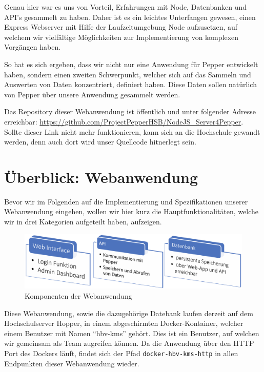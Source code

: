 Genau hier war es uns von Vorteil, Erfahrungen mit Node, Datenbanken und API's gesammelt zu haben. Daher ist es ein leichtes Unterfangen gewesen, einen Express Webserver mit Hilfe der Laufzeitumgebung Node aufzusetzen, auf welchem wir vielfältige Möglichkeiten zur Implementierung von komplexen Vorgängen haben.

So hat es sich ergeben, dass wir nicht nur eine Anwendung für Pepper entwickelt haben, sondern einen zweiten Schwerpunkt, welcher sich auf das Sammeln und Auswerten von Daten konzentriert, definiert haben. Diese Daten sollen natürlich von Pepper über unsere Anwendung gesammelt werden.

Das Repository dieser Webanwendung ist öffentlich und unter folgender Adresse erreichbar: \href{https://github.com/ProjectPepperHSB/NodeJS\_Server4Pepper}{https://github.com/ProjectPepperHSB/NodeJS\_Server4Pepper}. Sollte dieser Link nicht mehr funktionieren, kann sich an die Hochschule gewandt werden, denn auch dort wird unser Quellcode hitnerlegt sein.\\

\section{Überblick: Webanwendung}
\label{sec:nodechapter-ueberblick}
Bevor wir im Folgenden auf die Implementierung und Spezifikationen unserer Webanwendung eingehen, wollen wir hier kurz die Hauptfunktionalitäten, welche wir in drei Kategorien aufgeteilt haben, aufzeigen.\\

\begin{figure}[H]
    \includegraphics[width=\textwidth]{Figures/NodeChapter/WebAppComponents.png}
    \caption{Komponenten der Webanwendung}
    \label{fig:webappcomponents}
    \centering
\end{figure}

Diese Webanwendung, sowie die dazugehörige Datebank laufen derzeit auf dem Hochschulserver Hopper, in einem abgeschirmten Docker-Kontainer, welcher einem Benutzer mit Namen ``hbv-kms'' gehört. Dies ist ein Benutzer, auf welchen wir gemeinsam als Team zugreifen können. Da die Anwendung über den HTTP Port des Dockers läuft, findet sich der Pfad \verb|docker-hbv-kms-http| in allen Endpunkten dieser Webanwendung wieder.

